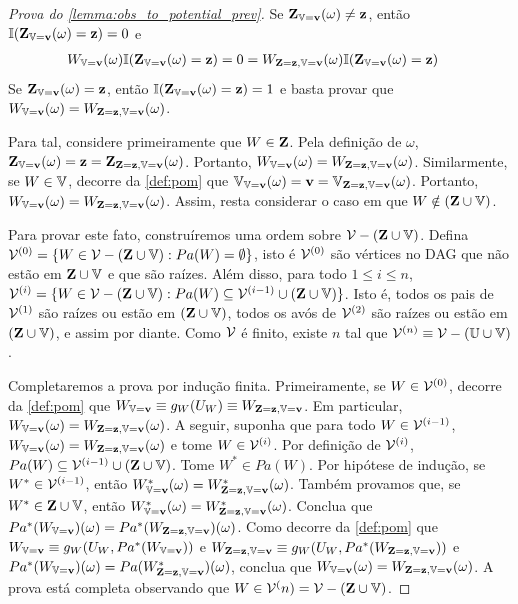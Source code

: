 \begin{proof}[Prova do \cref{lemma:obs_to_potential_prev}]
 Se $\Z_{\V=\bv}(\omega) \neq \bz$, então
 $\I(\Z_{\V=\bv}(\omega) = \bz) = 0$ e
 \begin{align*}
  W_{\V=\bv}(\omega) \I(\Z_{\V=\bv}(\omega) = \bz)
  &= 0 = W_{\Z = \bz, \V=\bv}(\omega) 
  \I(\Z_{\V=\bv}(\omega) = \bz)
 \end{align*}
 Se $\Z_{\V=\bv}(\omega) = \bz$, então
 $\I(\Z_{\V=\bv}(\omega) = \bz) = 1$ e
 basta provar que
 $W_{\V=\bv}(\omega) = W_{\Z = \bz, \V=\bv}(\omega)$.

 Para tal, considere primeiramente que $W \in \Z$.
 Pela definição de $\omega$, 
 $\Z_{\V=\bv}(\omega) = \bz = \Z_{\Z = \bz, \V=\bv}(\omega)$.
 Portanto, $W_{\V=\bv}(\omega) = W_{\Z = \bz, \V=\bv}(\omega)$.
 Similarmente, se $W \in \V$, decorre da \cref{def:pom} que
 $\V_{\V=\bv}(\omega) = \bv =\V_{\Z = \bz, \V=\bv}(\omega)$.
 Portanto, $W_{\V=\bv}(\omega) = W_{\Z = \bz, \V=\bv}(\omega)$.
 Assim, resta considerar o caso em que
 $W \notin (\Z \cup \V)$.
 
 Para provar este fato,
 construíremos uma ordem sobre $\sV-(\Z \cup \V)$.
 Defina $\sV^{(0)} = \{W \in \sV-(\Z \cup \V): Pa(W) = \emptyset\}$,
 isto é $\sV^{(0)}$ são vértices no DAG que 
 não estão em $\Z \cup \V$ e que são raízes.
 Além disso, para todo $1 \leq i \leq n$,
 $\sV^{(i)} = \{W \in \sV-(\Z \cup \V): 
 Pa(W) \subseteq \sV^{(i-1)} \cup (\Z \cup \V)\}$.
 Isto é, todos os pais de $\sV^{(1)}$ são raízes
 ou estão em $(\Z \cup \V)$,
 todos os avós de $\sV^{(2)}$ 
 são raízes ou estão em $(\Z \cup \V)$, e assim por diante.
 Como $\sV$ é finito, existe $n$ tal que
 $\sV^{(n)} \equiv \sV-(\U \cup \V)$.
 
 Completaremos a prova por indução finita.
 Primeiramente, se $W \in \sV^{(0)}$,
 decorre da \cref{def:pom} que
 $W_{\V=\bv} \equiv g_W(U_W) \equiv W_{\Z=\bz,\V=\bv}$.
 Em particular,
 $W_{\V=\bv}(\omega) = W_{\Z=\bz,\V=\bv}(\omega)$.
 A seguir, suponha que 
 para todo $W \in \sV^{(i-1)}$,
 $W_{\V=\bv}(\omega) =  W_{\Z=\bz,\V=\bv}(\omega)$ e
 tome $W \in \sV^{(i)}$.
 Por definição de $\sV^{(i)}$, 
 $Pa(W) \subseteq \sV^{(i-1)} \cup (\Z \cup \V)$.
 Tome $W^* \in Pa(W)$.
 Por hipótese de indução,
 se $W^* \in \sV^{(i-1)}$, então
 $W^*_{\V=\bv}(\omega) =  W^*_{\Z=\bz,\V=\bv}(\omega)$.
 Também provamos que, se $W^* \in \Z \cup \V$, então
 $W^*_{\V=\bv}(\omega) =  W^*_{\Z=\bz,\V=\bv}(\omega)$.
 Conclua que 
 $Pa^*(W_{\V=\bv})(\omega) = Pa^*(W_{\Z=\bz,\V=\bv})(\omega)$.
 Como decorre da \cref{def:pom} que
 $W_{\V=\bv} \equiv g_W(U_W, Pa^*(W_{\V=\bv}))$ e
 $W_{\Z=\bz,\V=\bv} \equiv g_W(U_W, Pa^*(W_{\Z=\bz,\V=\bv}))$ e
 $Pa^*(W_{\V=\bv})(\omega) = Pa(W^*_{\Z=\bz,\V=\bv})(\omega)$,
 conclua que
 $W_{\V=\bv}(\omega) = W_{\Z=\bz,\V=\bv}(\omega)$.
 A prova está completa observando que
 $W \in \sV^(n) = \sV - (\Z \cup \V)$.
\end{proof}

